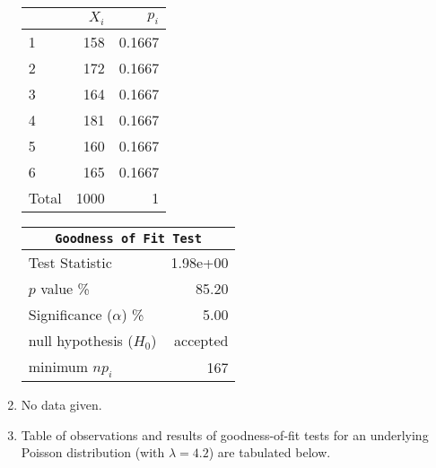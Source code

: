 \begin{enumerate}
	\begin{table}[H]
		\centering
		\begin{minipage}{0.4\textwidth}
			\centering
			\begin{tabular}{@{}lrr@{}}
				\toprule
				{} & $X_i$ &   $p_i$ \\
				\midrule
				1     &   158 &  0.1667 \\
				2     &   172 &  0.1667 \\
				3     &   164 &  0.1667 \\
				4     &   181 &  0.1667 \\
				5     &   160 &  0.1667 \\
				6     &   165 &  0.1667 \\
				\midrule
				Total &  1000 &       1 \\
				\bottomrule
			\end{tabular}
			
		\end{minipage}
		\begin{minipage}{0.4\textwidth}
			\centering
			\begin{tabular}{@{}lr@{}}
				\toprule
				\multicolumn{2}{c}{\texttt{Goodness of Fit Test}} \\
				\midrule
				Test Statistic             &  1.98e+00 \\
				$p$ value \%               &     85.20 \\
				Significance ($\alpha$) \% &      5.00 \\
				null hypothesis ($H_0$)    &  accepted \\
				minimum $n p_i$            &       167 \\
				\bottomrule
			\end{tabular}
			
		\end{minipage}
	\end{table}
	\bigskip
	
	\item No data given.
	
	\item Table of observations and results of goodness-of-fit tests for an underlying Poisson distribution (with $ \lambda = 4.2 $) are tabulated below.
	

\end{enumerate}
